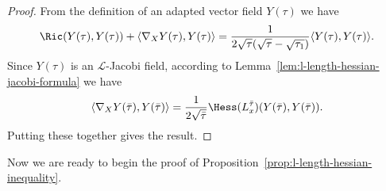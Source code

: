 \begin{proof}
\sketch
{}
From the definition of an adapted vector field  $Y(\tau)$  we have
\begin{equation*}
\Ric(Y(\tau),Y(\tau)) + \langle
\nabla_{X}Y(\tau),Y(\tau)\rangle =
\frac{1}{2\sqrt{\tau}(\sqrt{\tau}-\sqrt{\tau_1})}\langle
Y(\tau),Y(\tau)\rangle.
\end{equation*}
Since $Y(\tau)$ is an ${\mathcal L}$-Jacobi field, according to
Lemma~\ref{lem:l-length-hessian-jacobi-formula} we have
$$\langle\nabla_XY(\bar\tau),Y(\bar\tau)\rangle =
\frac{1}{2\sqrt{\bar\tau}}\Hess(L_x^{\bar\tau})(Y(\bar\tau),Y(\bar\tau)).$$ Putting these
together gives the result.
\end{proof}

Now we are ready to begin the proof of Proposition~\ref{prop:l-length-hessian-inequality}.


